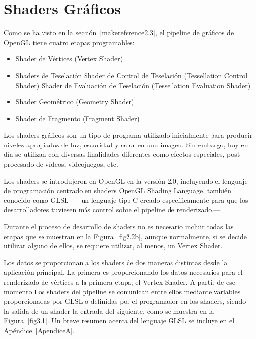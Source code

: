 \cleardoublepage

\chapter{Shaders Gráficos}
\label{makereference3}

Como se ha visto en la sección~\ref{makereference2.3}, el pipeline de gráficos
de OpenGL tiene cuatro etapas programables:

\begin{itemize}
		\item Shader de Vértices (Vertex Shader)
		\item Shaders de Teselación
				\subitem Shader de Control de Teselación (Tessellation Control
				Shader)
				\subitem Shader de Evaluación de Teselación (Tessellation
				Evaluation Shader)
		\item Shader Geométrico (Geometry Shader)
		\item Shader de Fragmento (Fragment Shader)
\end{itemize}

Los shaders gráficos son un tipo de programa utilizado inicialmente para
producir niveles apropiados de luz, oscuridad y color en una imagen. Sin
embargo, hoy en día se utilizan con diversas finalidades diferentes como efectos
especiales, post procesado de vídeos, videojuegos, etc.

Los shaders se introdujeron en OpenGL en la versión 2.0, incluyendo el lenguaje
de programación centrado en shaders OpenGL Shading Language, también conocido
como GLSL~\cite{GLSL}--- un lenguaje tipo C creado específicamente para que los
desarrolladores tuviesen más control sobre el pipeline de renderizado.---

Durante el proceso de desarrollo de shaders no es necesario incluir todas las
etapas que se muestran en la Figura~\ref{fig2.2b}, aunque normalmente, si se
decide utilizar alguno de ellos, se requiere utilizar, al menos, un Vertex
Shader. 

Los datos se proporcionan a los shaders de dos maneras distintas desde la
aplicación principal. La primera es proporcionando los datos necesarios para el
renderizado de vértices a la primera etapa, el Vertex Shader. A partir de ese
momento Los shaders del pipeline se comunican entre ellos mediante variables
proporcionadas por GLSL o definidas por el programador en los shaders, siendo la
salida de un shader la entrada del siguiente, como se muestra en la
Figura~\ref{fig3.1}. Un breve resumen acerca del lenguaje GLSL se incluye en el
Apéndice~\ref{ApendiceA}. 

